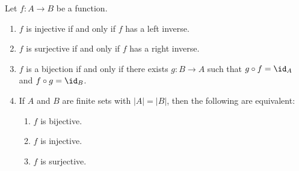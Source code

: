 \begin{proposition}
    Let $f : A \to B$ be a function.
    \begin{enumerate}
        \item $f$ is injective if and only if $f$ has a left inverse.
        \item $f$ is surjective if and only if $f$ has a right inverse.
        \item $f$ is a bijection if and only if there exists $g : B \to A$ such that $g \circ f = \id_A$ and $f \circ g = \id_B$.
        \item If $A$ and $B$ are finite sets with $|A| = |B|$, then the following are equivalent:
        \begin{enumerate}
            \item $f$ is bijective. \quad \item $f$ is injective. \quad \item $f$ is surjective.
        \end{enumerate}
    \end{enumerate}
\end{proposition}

